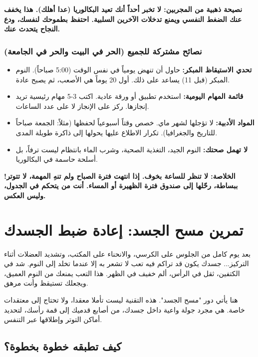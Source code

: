 \documentclass[12pt,a4paper]{book}
\newcommand{\importantAr}[1]{%
	\begin{important}
		\bfseries #1
	\end{important}
}
\begin{document}
	\importantAr{نصيحة ذهبية من المجربين: لا تخبر أحداً أنك تعيد البكالوريا (عدا أهلك). هذا يخفف عنك الضغط النفسي ويمنع تدخلات الآخرين السلبية. احتفظ بطموحك لنفسك، ودع النجاح يتحدث عنك.}
	
	\subsubsection{نصائح مشتركة للجميع (الحر في البيت والحر في الجامعة)}
	\label{sec:random-tips7}
	
	\begin{itemize}
		\item \textbf{تحدي الاستيقاظ المبكر:} حاول أن تنهض يومياً في نفس الوقت (5:00 صباحاً). النوم المبكر (قبل 11) يساعد على ذلك. أول 20 يوماً هي الأصعب، ثم يصبح عادة.
		\item \textbf{قائمة المهام اليومية:} استخدم تطبيق  أو ورقة عادية. اكتب 3-5 مهام رئيسية تريد إنجازها. ركز على الإنجاز لا على عدد الساعات.
		\item \textbf{المواد الأدبية:} لا تؤجلها لشهر ماي. خصص وقتاً أسبوعياً لحفظها (مثلاً: الجمعة صباحاً للتاريخ والجغرافيا). تكرار الاطلاع عليها يحولها إلى ذاكرة طويلة المدى.
		\item \textbf{لا تهمل صحتك:} النوم الجيد، التغذية الصحية، وشرب الماء بانتظام ليست ترفاً، بل أسلحة حاسمة في البكالوريا.
	\end{itemize}
	
	
	\importantAr{الخلاصة: لا تنظر للساعة بخوف. إذا انتهت فترة الصباح ولم تنهِ المهمة، لا تتوتر! ببساطة، رحّلها إلى صندوق فترة الظهيرة أو المساء. أنت من يتحكم في الجدول، وليس العكس.}
	
	\section{تمرين مسح الجسد: إعادة ضبط الجسدك}
	\label{sec:body-scan}
	
	بعد يوم كامل من الجلوس على الكرسي، والانحناء على المكتب، وتشديد العضلات أثناء التركيز... جسدك يكون قد تراكم فيه تعب لا تشعر به إلا عندما تخلد إلى النوم. شد في الكتفين، ثقل في الرأس، ألم خفيف في الظهر. هذا التعب يمنعك من النوم العميق، ويجعلك تستيقظ وأنت مرهق.
	
	هنا يأتي دور "مسح الجسد". هذه التقنية ليست تأملا معقدا، ولا تحتاج إلى معتقدات خاصة. هي مجرد جولة واعية داخل جسدك، من أصابع قدميك إلى قمة رأسك، لتحديد أماكن التوتر وإطلاقها عبر التنفس.
	
	\subsection{كيف تطبقه خطوة بخطوة؟}
	
\end{document}
